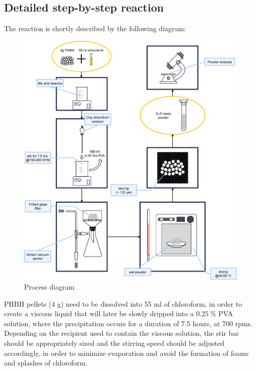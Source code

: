 \documentclass{article}
\begin{document}
        \subsection{Detailed step-by-step reaction\label{detailed_reaction}}

        The reaction is shortly described by the following diagram: 

            \begin{figure}[h!]
                \centering
                \includegraphics[width=\textwidth]{Pictures/process_diagram.eps}
                \caption{Process diagram \autocite{Inkscape}}
                \label{fig:process_diagram}
            \end{figure}

        \clearpage

        PHBH pellets (4 g) need to be dissolved into 55 ml of chloroform, in order to create a viscous liquid that will later be slowly dripped into a 
        $0.25 \ \%$ PVA solution, where the precipitation occurs for a duration of 7.5 hours, at 700 rpms. \\ 

        Depending on the recipient used to contain the viscous solution, the stir bar should be appropriately sized and 
        the stirring speed should be adjusted accordingly, in order to minimize evaporation and avoid the formation of foams and 
        splashes of chloroform. \\ 
        
\end{document}
